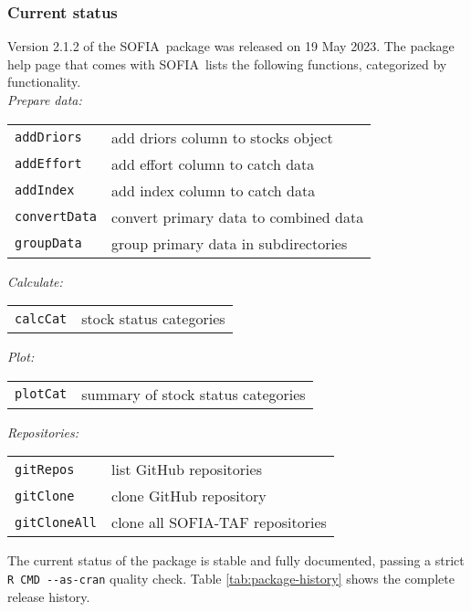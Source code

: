 \documentclass[12pt]{article}
\newcommand\SOFIA{{\sf SOFIA}}
\begin{document}
\subsubsection{Current status}

Version 2.1.2 of the \SOFIA\ package was released on 19 May 2023. The package
help page that comes with \SOFIA\ lists the following functions, categorized by
functionality.\\[-2ex]

{\it Prepare data:}

\begin{tabular}{ll}
  \verb|addDriors|   & add driors column to stocks object\\
  \verb|addEffort|   & add effort column to catch data\\
  \verb|addIndex|    & add index column to catch data\\
  \verb|convertData| & convert primary data to combined data\\
  \verb|groupData|   & group primary data in subdirectories\\[1.5ex]
\end{tabular}

{\it Calculate:}

\begin{tabular}{ll}
  \verb|calcCat| & stock status categories\\[1.5ex]
\end{tabular}

{\it Plot:}

\begin{tabular}{ll}
  \verb|plotCat| & summary of stock status categories\\[1.5ex]
\end{tabular}

{\it Repositories:}

\begin{tabular}{ll}
  \verb|gitRepos|    & list GitHub repositories\\
  \verb|gitClone|    & clone GitHub repository\\
  \verb|gitCloneAll| & clone all SOFIA-TAF repositories\\[1.5ex]
\end{tabular}

The current status of the package is stable and fully documented, passing a
strict \verb|R CMD --as-cran| quality check. Table \ref{tab:package-history}
shows the complete release history.

\newpage
\end{document}
